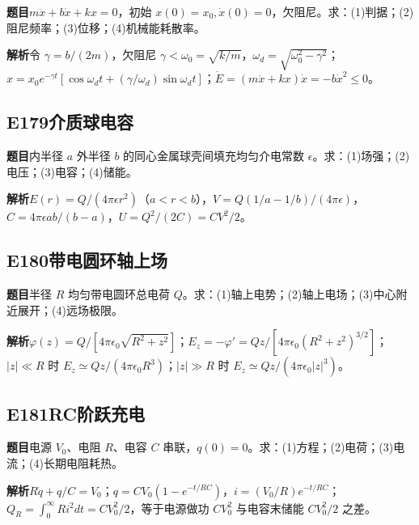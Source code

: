 \textbf{题目}\quad $m\ddot x+b\dot x+kx=0$，初始 $x(0)=x_0,\dot x(0)=0$，欠阻尼。求：(1)判据；(2)阻尼频率；(3)位移；(4)机械能耗散率。

\par\textbf{解析}\quad 令 $\gamma=b/(2m)$，欠阻尼 $\gamma<\omega_0=\sqrt{k/m}$，$\omega_d=\sqrt{\omega_0^2-\gamma^2}$；$x=x_0e^{-\gamma t}[\cos\omega_dt+(\gamma/\omega_d)\sin\omega_dt]$；$\dot E=(m\ddot x+kx)\dot x=-b\dot x^2\le0$。

\par\medskip

\subsection*{E179\quad 介质球电容}

\textbf{题目}\quad 内半径 $a$ 外半径 $b$ 的同心金属球壳间填充均匀介电常数 $\epsilon$。求：(1)场强；(2)电压；(3)电容；(4)储能。

\par\textbf{解析}\quad $E(r)=Q/(4\pi\epsilon r^2)$（$a<r<b$），$V=Q(1/a-1/b)/(4\pi\epsilon)$，$C=4\pi\epsilon ab/(b-a)$，$U=Q^2/(2C)=CV^2/2$。

\par\medskip

\subsection*{E180\quad 带电圆环轴上场}

\textbf{题目}\quad 半径 $R$ 均匀带电圆环总电荷 $Q$。求：(1)轴上电势；(2)轴上电场；(3)中心附近展开；(4)远场极限。

\par\textbf{解析}\quad $\varphi(z)=Q/[4\pi\epsilon_0\sqrt{R^2+z^2}]$；$E_z=-\varphi'=Qz/[4\pi\epsilon_0(R^2+z^2)^{3/2}]$；$|z|\ll R$ 时 $E_z\simeq Qz/(4\pi\epsilon_0R^3)$；$|z|\gg R$ 时 $E_z\simeq Qz/(4\pi\epsilon_0|z|^3)$。

\par\medskip

\subsection*{E181\quad RC阶跃充电}

\textbf{题目}\quad 电源 $V_0$、电阻 $R$、电容 $C$ 串联，$q(0)=0$。求：(1)方程；(2)电荷；(3)电流；(4)长期电阻耗热。

\par\textbf{解析}\quad $R\dot q+q/C=V_0$；$q=CV_0(1-e^{-t/RC})$，$i=(V_0/R)e^{-t/RC}$；$Q_R=\int_0^\infty Ri^2dt=CV_0^2/2$，等于电源做功 $CV_0^2$ 与电容末储能 $CV_0^2/2$ 之差。

